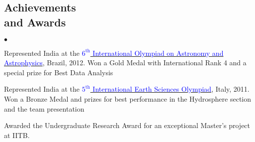 \documentclass[margin,line]{res}
\newenvironment{list2}{
  \begin{list}{$\bullet$}{%
      \setlength{\itemsep}{0in}
      \setlength{\parsep}{0in} \setlength{\parskip}{0in}
      \setlength{\topsep}{0in} \setlength{\partopsep}{0in} 
      \setlength{\leftmargin}{0.18in}}}{\end{list}}
\begin{document}
\begin{resume}
\section{\sc Achievements \\and Awards}
\begin{list2}
\item Represented India at the \href{http://www.ioaa2012.ufrj.br/}{\textcolor{blue} {$6^\text{th}$ International Olympiad on Astronomy and Astrophysics}}, Brazil, 2012. Won a Gold Medal with International Rank 4 and a special prize for Best Data Analysis
\item Represented India at the \href{http://www.ieso2011.unimore.it/}{\textcolor{blue} {$5^\text{th}$ International Earth Sciences Olympiad}}, Italy, 2011. Won a Bronze Medal and prizes for best performance in the Hydrosphere section and the team presentation
\item Awarded the Undergraduate Research Award for an exceptional Master's project at IITB.
\end{list2}



\end{resume}
\end{document}
